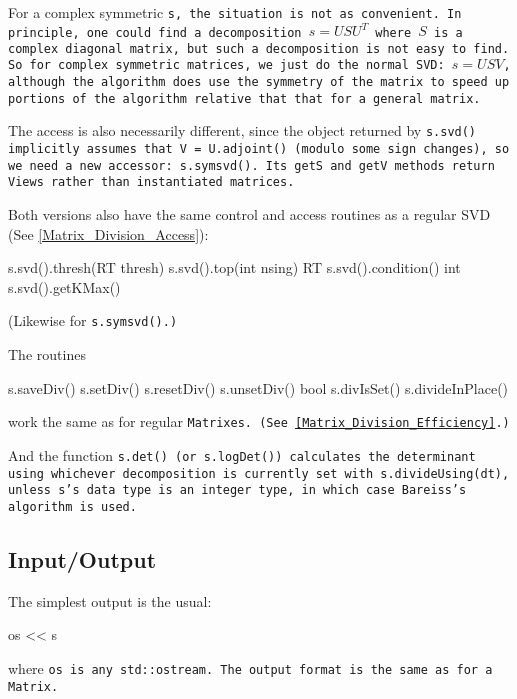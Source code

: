 \begin{enumerate}
For a complex symmetric \tt{s}, the situation is not as convenient.
In principle, one could find a decomposition $s = USU^T$ where $S$ is 
a complex diagonal matrix, but such a decomposition is not easy to find. 
So for complex symmetric matrices, we
just do the normal SVD: $s = USV$, although the algorithm
does use the symmetry of the matrix to 
speed up portions of the algorithm relative that that for a general matrix.

The access is also necessarily different, since the object returned by 
\tt{s.svd()} implicitly assumes that \tt{V = U.adjoint()} (modulo some sign changes), 
so we need a 
new accessor: \tt{s.symsvd()}.  Its \tt{getS} and \tt{getV} methods return Views
rather than instantiated matrices.

Both versions also have the same control and access routines as a regular SVD
(See \ref{Matrix_Division_Access}):
\begin{tmvcode}
s.svd().thresh(RT thresh)
s.svd().top(int nsing)
RT s.svd().condition()
int s.svd().getKMax()
\end{tmvcode}
(Likewise for \tt{s.symsvd()}.)

\end{enumerate}
The routines 
\begin{tmvcode}
s.saveDiv()
s.setDiv()
s.resetDiv()
s.unsetDiv()
bool s.divIsSet()
s.divideInPlace()
\end{tmvcode}
work the same as for regular \tt{Matrix}es.
(See \ref{Matrix_Division_Efficiency}.)

And the function \tt{s.det()} (or \tt{s.logDet()}) calculates the determinant
using whichever decomposition is currently set with \tt{s.divideUsing(dt)},
unless \tt{s}'s data type is an integer type, in which case Bareiss's algorithm 
is used.

\subsection{Input/Output}
\label{SymMatrix_IO}

The simplest output is the usual:
\begin{tmvcode}
os << s
\end{tmvcode}
where \tt{os} is any \tt{std::ostream}.
The output format is the same as for a \tt{Matrix}.

